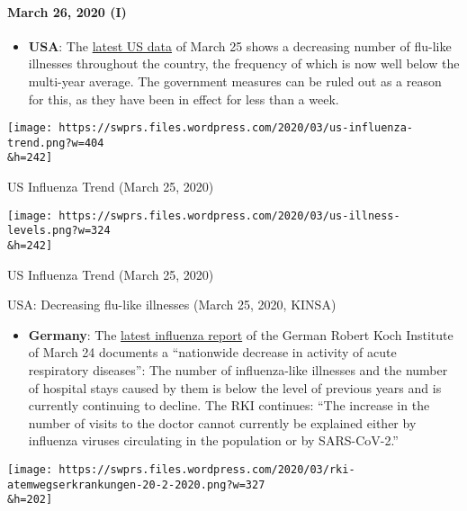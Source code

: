 \hypertarget{march-26-2020-i}{%
\paragraph{March 26, 2020 (I)}\label{march-26-2020-i}}

\begin{itemize}
\tightlist
\item
  \textbf{USA}: The \href{https://healthweather.us/}{latest US data} of
  March 25 shows a decreasing number of flu-like illnesses throughout
  the country, the frequency of which is now well below the multi-year
  average. The government measures can be ruled out as a reason for
  this, as they have been in effect for less than a week.
\end{itemize}

\href{https://swprs.org/covid-19-hinweis-ii/us-influenza-trend/}{}

\texttt{[image: https://swprs.files.wordpress.com/2020/03/us-influenza-trend.png?w=404\\\&h=242]}

US Influenza Trend (March 25, 2020)

\href{https://swprs.org/covid-19-hinweis-ii/us-illness-levels/}{}

\texttt{[image: https://swprs.files.wordpress.com/2020/03/us-illness-levels.png?w=324\\\&h=242]}

US Influenza Trend (March 25, 2020)

USA: Decreasing flu-like illnesses (March 25, 2020, KINSA)

\begin{itemize}
\tightlist
\item
  \textbf{Germany}: The
  \href{https://influenza.rki.de/Wochenberichte/2019_2020/2020-12.pdf}{latest
  influenza report} of the German Robert Koch Institute of March 24
  documents a ``nationwide decrease in activity of acute respiratory
  diseases'': The number of influenza-like illnesses and the number of
  hospital stays caused by them is below the level of previous years and
  is currently continuing to decline. The RKI continues: ``The increase
  in the number of visits to the doctor cannot currently be explained
  either by influenza viruses circulating in the population or by
  SARS-CoV-2.''
\end{itemize}

\href{https://swprs.org/covid-19-hinweis-ii/rki-atemwegserkrankungen-20-2-2020/}{}

\texttt{[image: https://swprs.files.wordpress.com/2020/03/rki-atemwegserkrankungen-20-2-2020.png?w=327\\\&h=202]}

